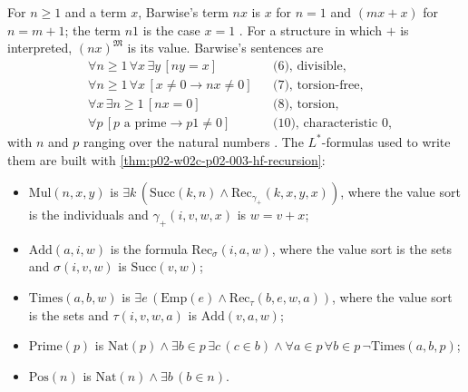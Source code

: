 For \(n\geq1\) and a term \(x\), Barwise's term \(nx\) is \(x\) for
\(n=1\) and \((mx+x)\) for \(n=m+1\); the term \(n1\) is the case
\(x=1\) \cite[ch.~A.1, \S2, pp.~8, 12]{Barwise1977FirstOrder}.  For a
structure in which \(+\) is interpreted, \((nx)^{\mathfrak M}\) is its
value.  Barwise's sentences are
\begin{align*}
&\forall n\geq1\,\forall x\,\exists y\,[ny=x] &&\text{(6), divisible,}\\
&\forall n\geq1\,\forall x\,[x\neq0\to nx\neq0] &&\text{(7), torsion-free,}\\
&\forall x\,\exists n\geq1\,[nx=0] &&\text{(8), torsion,}\\
&\forall p\,[p\text{ a prime}\to p1\neq0] &&\text{(10), characteristic }0,
\end{align*}
with \(n\) and \(p\) ranging over the natural numbers
\cite[ch.~A.1, \S2, pp.~8--9, 15]{Barwise1977FirstOrder}.  The
\(L^{*}\)-formulas used to write them are built with
\cref{thm:p02-w02c-p02-003-hf-recursion}:
\begin{itemize}
\item \(\mathrm{Mul}(n,x,y)\) is \(\exists k\,(\mathrm{Succ}(k,n)\land
      \mathrm{Rec}_{\gamma_+}(k,x,y,x))\), where the value sort is the
      individuals and \(\gamma_+(i,v,w,x)\) is \(w=v+x\);
\item \(\mathrm{Add}(a,i,w)\) is the formula
      \(\mathrm{Rec}_{\sigma}(i,a,w)\), where the value sort is the sets and \(\sigma(i,v,w)\) is
      \(\mathrm{Succ}(v,w)\);
\item \(\mathrm{Times}(a,b,w)\) is \(\exists e\,(\mathrm{Emp}(e)\land
      \mathrm{Rec}_{\tau}(b,e,w,a))\), where the value sort is the sets and
      \(\tau(i,v,w,a)\) is \(\mathrm{Add}(v,a,w)\);
\item \(\mathrm{Prime}(p)\) is \(\mathrm{Nat}(p)\land\exists b\in p\,
      \exists c\,(c\in b)\land\forall a\in p\,\forall b\in p\,
      \neg\mathrm{Times}(a,b,p)\);
\item \(\mathrm{Pos}(n)\) is \(\mathrm{Nat}(n)\land\exists b\,(b\in n)\).
\end{itemize}

